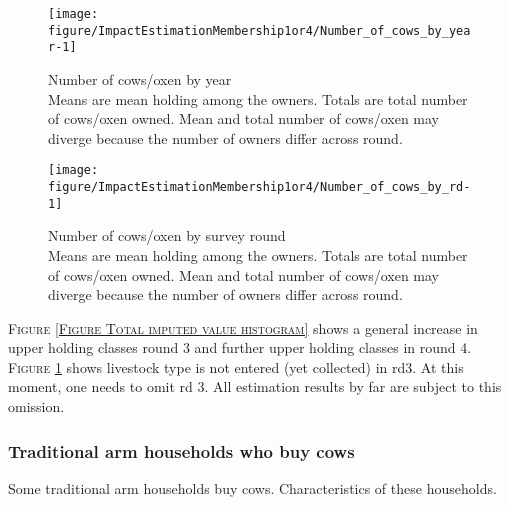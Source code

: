 \begin{Schunk}
\begin{figure}

{\centering \texttt{[image: figure/ImpactEstimationMembership1or4/Number\_of\_cows\_by\_year-1]} 

}

\caption{Number of cows/oxen by year\\ {\footnotesize Means are mean holding among the owners. Totals are total number of cows/oxen owned. Mean and total number of cows/oxen may diverge because the number of owners differ across round.\setlength{\baselineskip}{8pt}}}\label{Figure Number of cows by year}
\end{figure}
\end{Schunk}
\begin{Schunk}
\begin{figure}

{\centering \texttt{[image: figure/ImpactEstimationMembership1or4/Number\_of\_cows\_by\_rd-1]} 

}

\caption{Number of cows/oxen by survey round\\ {\footnotesize Means are mean holding among the owners. Totals are total number of cows/oxen owned. Mean and total number of cows/oxen may diverge because the number of owners differ across round.\setlength{\baselineskip}{8pt}}}\label{Figure Number of cows by rd}
\end{figure}
\end{Schunk}
\begin{palepinkleftbar}
\begin{finding}
\textsc{\small Figure \ref{Figure Total imputed value histogram}} shows a general increase in upper holding classes round 3 and further upper holding classes in round 4. \textsc{\small Figure \ref{Figure Number of cows by year}} shows livestock type is not entered (yet collected) in rd3. At this moment, one needs to omit rd 3. All estimation results by far are subject to this omission.
\end{finding}
\end{palepinkleftbar}

\subsubsection{Traditional arm households who buy cows}

Some traditional arm households buy cows. Characteristics of these households.


